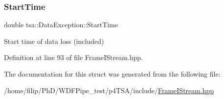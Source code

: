 \subsubsection{\texorpdfstring{Start\+Time}{StartTime}}
{\footnotesize\ttfamily double tsa\+::\+Data\+Exception\+::\+Start\+Time}

Start time of data loss (included) 

Definition at line 93 of file Frame\+I\+Stream.\+hpp.



The documentation for this struct was generated from the following file\+:\begin{DoxyCompactItemize}
\item 
/home/filip/\+Ph\+D/\+W\+D\+F\+Pipe\+\_\+test/p4\+T\+S\+A/include/\hyperlink{_frame_i_stream_8hpp}{Frame\+I\+Stream.\+hpp}\end{DoxyCompactItemize}
